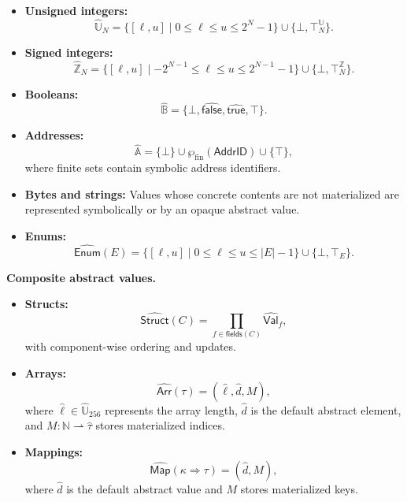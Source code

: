 \documentclass[11pt,oneside]{report}
\theoremstyle{plain}
\theoremstyle{definition}
\theoremstyle{remark}
\begin{document}
\begin{itemize}

\item \textbf{Unsigned integers:}
\[
\widehat{\mathbb{U}}_N =
\{[\ell,u] \mid 0 \le \ell \le u \le 2^N-1\}
\cup \{\bot,\top^{\mathbb{U}}_N\}.
\]

\item \textbf{Signed integers:}
\[
\widehat{\mathbb{Z}}_N =
\{[\ell,u] \mid -2^{N-1} \le \ell \le u \le 2^{N-1}-1\}
\cup \{\bot,\top^{\mathbb{Z}}_N\}.
\]

\item \textbf{Booleans:}
\[
\widehat{\mathbb{B}} =
\{\bot,
\widehat{\mathsf{false}},
\widehat{\mathsf{true}},
\top\}.
\]

\item \textbf{Addresses:}
\[
\widehat{\mathbb{A}}
=
\{\bot\}
\cup
\wp_{\mathrm{fin}}(\mathsf{AddrID})
\cup
\{\top\},
\]
where finite sets contain symbolic address identifiers.

\item \textbf{Bytes and strings:}
Values whose concrete contents are not materialized are represented symbolically or by an opaque abstract value.

\item \textbf{Enums:}
\[
\widehat{\mathsf{Enum}}(E)
=
\{[\ell,u] \mid 0\le\ell\le u\le |E|-1\}
\cup
\{\bot,\top_E\}.
\]

\end{itemize}

\noindent\textbf{Composite abstract values.}

\begin{itemize}

\item \textbf{Structs:}
\[
\widehat{\mathsf{Struct}}(C)
=
\prod_{f\in\mathsf{fields}(C)}
\widehat{\mathsf{Val}}_f,
\]
with component-wise ordering and updates.

\item \textbf{Arrays:}
\[
\widehat{\mathsf{Arr}}(\tau)
=
(\hat{\ell},\hat{d},M),
\]
where \(\hat{\ell}\in\widehat{\mathbb{U}}_{256}\) represents the array length,
\(\hat{d}\) is the default abstract element,
and \(M:\mathbb{N}\rightharpoonup\widehat{\tau}\) stores materialized indices.

\item \textbf{Mappings:}
\[
\widehat{\mathsf{Map}}(\kappa\Rightarrow\tau)
=
(\hat{d},M),
\]
where \(\hat{d}\) is the default abstract value and \(M\) stores materialized keys.

\end{itemize}
\end{document}
